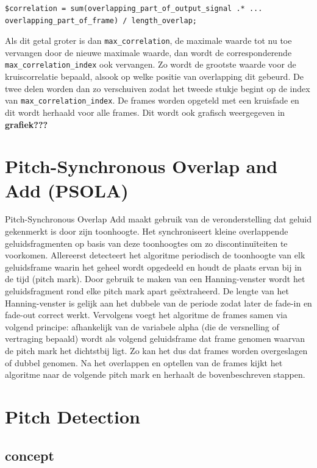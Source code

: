 \documentclass[12pt]{report}
\begin{document}
\begin{verbatim}
$correlation = sum(overlapping_part_of_output_signal .* ...
overlapping_part_of_frame) / length_overlap;
\end{verbatim}

Als dit getal groter is dan \verb|max_correlation|, de maximale waarde tot nu toe  vervangen door de nieuwe maximale waarde, dan wordt de corresponderende \verb|max_correlation_index| ook vervangen.
Zo wordt de grootste waarde voor de kruiscorrelatie bepaald, alsook op welke positie van overlapping dit gebeurd. De twee delen worden dan zo verschuiven zodat het tweede stukje begint op de index van \verb|max_correlation_index|. De frames worden opgeteld met een kruisfade en dit wordt herhaald voor alle frames. Dit wordt ook grafisch weergegeven in \textbf{grafiek???}

\section{Pitch-Synchronous Overlap and Add (PSOLA)}
Pitch-Synchronous Overlap Add maakt gebruik van de veronderstelling dat geluid gekenmerkt is door zijn toonhoogte. Het synchroniseert kleine overlappende geluidsfragmenten op basis van deze toonhoogtes om zo discontinuïteiten te voorkomen. 
Allereerst detecteert het algoritme periodisch de toonhoogte van elk geluidsframe waarin het geheel wordt opgedeeld en houdt de plaats ervan bij in de tijd (pitch mark). Door gebruik te maken van een Hanning-venster wordt het geluidsfragment rond elke pitch mark apart geëxtraheerd. De lengte van het Hanning-venster is gelijk aan het dubbele van de periode zodat later de fade-in en fade-out correct werkt.
Vervolgens voegt het algoritme de frames samen via volgend principe: afhankelijk van de variabele alpha (die de versnelling of vertraging bepaald) wordt als volgend geluidsframe dat frame genomen waarvan de pitch mark het dichtstbij ligt. Zo kan het dus dat frames worden overgeslagen of dubbel genomen. Na het overlappen en optellen van de frames kijkt het algoritme naar de volgende pitch mark en herhaalt de bovenbeschreven stappen.


\section{Pitch Detection} 

\subsection{concept}
\end{document}
